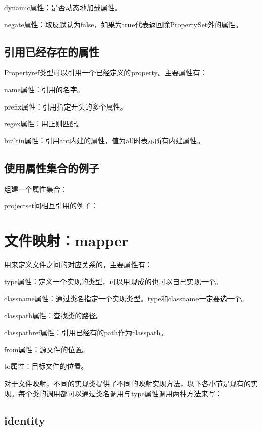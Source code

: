		dynamic属性：是否动态地加载属性。

		negate属性：取反默认为false，如果为true代表返回除PropertySet外的属性。

	\subsection{引用已经存在的属性}

		Propertyref类型可以引用一个已经定义的property。主要属性有：

		name属性：引用的名字。

		prefix属性：引用指定开头的多个属性。

		regex属性：用正则匹配。

		builtin属性：引用ant内建的属性，值为all时表示所有内建属性。

	\subsection{使用属性集合的例子}

		组建一个属性集合：

		
		
		projectset间相互引用的例子：
		
		
		
\section{文件映射：mapper}

	用来定义文件之间的对应关系的，主要属性有：

	type属性：定义一个实现的类型，可以用现成的也可以自己实现一个。

	classname属性：通过类名指定一个实现类型。type和classname一定要选一个。

	classpath属性：查找类的路径。

	classpathref属性：引用已经有的path作为classpath。

	from属性：源文件的位置。

	to属性：目标文件的位置。

	对于文件映射，不同的实现类提供了不同的映射实现方法，以下各小节是现有的实现。每个类的调用都可以通过类名调用与type属性调用两种方法来写：

	\subsection{identity}

